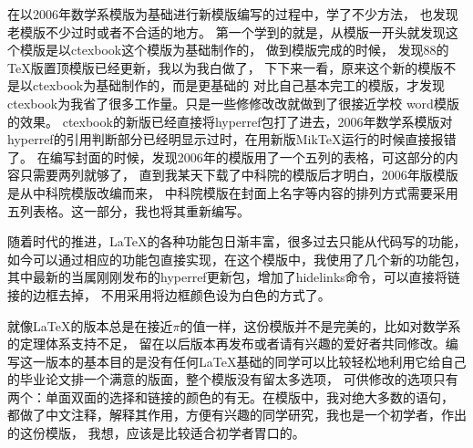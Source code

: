 \begin{preface}
在以2006年数学系模版为基础进行新模版编写的过程中，学了不少方法，
也发现老模版不少过时或者不合适的地方。
第一个学到的就是，从模版一开头就发现这个模版是以ctexbook这个模版为基础制作的，
做到模版完成的时候，
发现88的\TeX{}版置顶模版已经更新，我以为我白做了，
下下来一看，原来这个新的模版不是以ctexbook为基础制作的，而是更基础的\LaTeXe\index{\LaTeX}
对比自己基本完工的模版，才发现ctexbook为我省了很多工作量。只是一些修修改改就做到了很接近学校
word模版的效果。
ctexbook的新版已经直接将hyperref包打了进去，2006年数学系模版对hyperref的引用判断部分已经明显示过时，在用新版MikTeX运行的时候直接报错了。
在编写封面的时候，发现2006年的模版用了一个五列的表格，可这部分的内容只需要两列就够了，
直到我某天下载了中科院的模版后才明白，2006年版模版是从中科院模版改编而来，
中科院模版在封面上名字等内容的排列方式需要采用五列表格。这一部分，我也将其重新编写。

随着时代的推进，\LaTeX{}的各种功能包日渐丰富，很多过去只能从\LaTeXe{}代码写的功能，
如今可以通过相应的功能包直接实现，在这个模版中，我使用了几个新的功能包，
其中最新的当属刚刚发布的hyperref更新包，增加了hidelinks命令，可以直接将链接的边框去掉，
不用采用将边框颜色设为白色的方式了。

就像\LaTeX{}的版本总是在接近$\pi$的值一样，这份模版并不是完美的，比如对数学系的定理体系支持不足，
留在以后版本再发布或者请有兴趣的爱好者共同修改。编写这一版本的基本目的是没有任何\LaTeX{}基础的同学可以比较轻松地利用它给自己的毕业论文排一个满意的版面，整个模版没有留太多选项，
可供修改的选项只有两个：单面双面的选择和链接的颜色的有无。在模版中，我对绝大多数的语句，
都做了中文注释，解释其作用，方便有兴趣的同学研究，我也是一个初学者，作出的这份模版，
我想，应该是比较适合初学者胃口的。

\end{preface}
